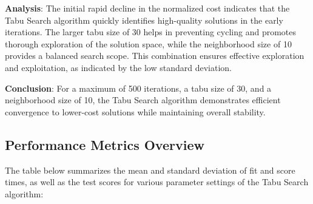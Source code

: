 \documentclass[
]{article}
\begin{document}
    \textbf{Analysis}: The initial rapid decline in the normalized cost indicates that the Tabu Search algorithm quickly identifies high-quality solutions in the early iterations. The larger tabu size of 30 helps in preventing cycling and promotes thorough exploration of the solution space, while the neighborhood size of 10 provides a balanced search scope. This combination ensures effective exploration and exploitation, as indicated by the low standard deviation.

    \textbf{Conclusion}: For a maximum of 500 iterations, a tabu size of 30, and a neighborhood size of 10, the Tabu Search algorithm demonstrates efficient convergence to lower-cost solutions while maintaining overall stability.

    \subsection{Performance Metrics Overview}

    The table below summarizes the mean and standard deviation of fit and score times, as well as the test scores for various parameter settings of the Tabu Search algorithm:
\end{document}
